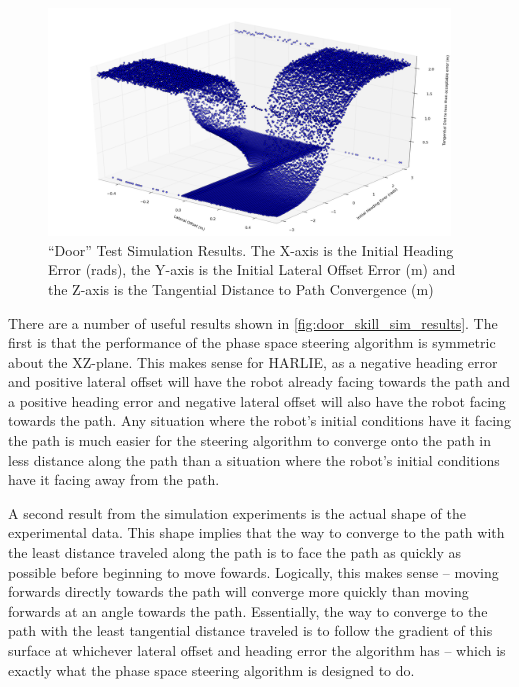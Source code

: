 \begin{figure}
\centering
\includegraphics[width=0.95\textwidth]{images/acceptable_error_surface}
\caption[``Door'' Test Simulation Results]{``Door'' Test Simulation Results. The X-axis is the Initial Heading Error (rads), the Y-axis is the Initial Lateral Offset Error (m) and the Z-axis is the Tangential Distance to Path Convergence (m)}
\label{fig:door_skill_sim_results}
\end{figure}

There are a number of useful results shown in \autoref{fig:door_skill_sim_results}. The first is that the performance of the phase space steering algorithm is symmetric about the XZ-plane. This makes sense for HARLIE, as a negative heading error and positive lateral offset will have the robot already facing towards the path and a positive heading error and negative lateral offset will also have the robot facing towards the path. Any situation where the robot's initial conditions have it facing the path is much easier for the steering algorithm to converge onto the path in less distance along the path than a situation where the robot's initial conditions have it facing away from the path.

A second result from the simulation experiments is the actual shape of the experimental data. This shape implies that the way to converge to the path with the least distance traveled along the path is to face the path as quickly as possible before beginning to move fowards. Logically, this makes sense -- moving forwards directly towards the path will converge more quickly than moving forwards at an angle towards the path. Essentially, the way to converge to the path with the least tangential distance traveled is to follow the gradient of this surface at whichever lateral offset and heading error the algorithm has -- which is exactly what the phase space steering algorithm is designed to do.

